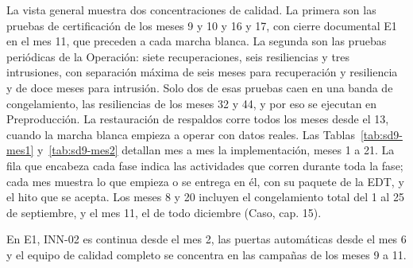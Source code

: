 
La vista general muestra dos concentraciones de calidad. La primera son las pruebas de certificación de los meses 9 y 10 y 16 y 17, con cierre documental E1 en el mes 11, que preceden a cada marcha blanca. La segunda son las pruebas periódicas de la Operación: siete recuperaciones, seis resiliencias y tres intrusiones, con separación máxima de seis meses para recuperación y resiliencia y de doce meses para intrusión. Solo dos de esas pruebas caen en una banda de congelamiento, las resiliencias de los meses 32 y 44, y por eso se ejecutan en Preproducción. La restauración de respaldos corre todos los meses desde el 13, cuando la marcha blanca empieza a operar con datos reales. Las Tablas~\ref{tab:sd9-mes1} y~\ref{tab:sd9-mes2} detallan mes a mes la implementación, meses 1 a 21. La fila que encabeza cada fase indica las actividades que corren durante toda la fase; cada mes muestra lo que empieza o se entrega en él, con su paquete de la EDT, y el hito que se acepta. Los meses 8 y 20 incluyen el congelamiento total del 1 al 25 de septiembre, y el mes 11, el de todo diciembre (Caso, cap. 15).

En E1, INN-02 es continua desde el mes 2, las puertas automáticas desde el mes 6 y el equipo de calidad completo se concentra en las campañas de los meses 9 a 11.

